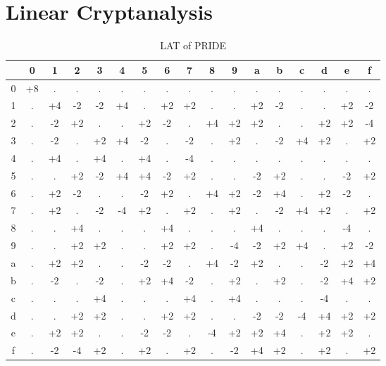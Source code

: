 \documentclass{transcrypto}
\begin{document}
	\section{Linear Cryptanalysis}
	\begin{table}[H]
		\centering
		\begin{tabular}{c|cccccccccccccccc}
			&0 &  1 &  2 &  3 &  4 &  5 &  6 &  7 &  8 &  9 &  a &  b &  c &  d &  e &  f\\
			\hline 
			0 &   +8 &    . &    . &    . &    . &    . &    . &    . &    . &    . &    . &    . &    . &    . &    . &    .\\
			1 &    . &   +4 &   -2 &   -2 &   +4 &    . &   +2 &   +2 &    . &    . &   +2 &   -2 &    . &    . &   +2 &   -2\\
			2 &    . &   -2 &   +2 &    . &    . &   +2 &   -2 &    . &   +4 &   +2 &   +2 &    . &    . &   +2 &   +2 &   -4\\
			3 &    . &   -2 &    . &   +2 &   +4 &   -2 &    . &   -2 &    . &   +2 &    . &   -2 &   +4 &   +2 &    . &   +2\\
			4 &    . &   +4 &    . &   +4 &    . &   +4 &    . &   -4 &    . &    . &    . &    . &    . &    . &    . &    .\\
			5 &    . &    . &   +2 &   -2 &   +4 &   +4 &   -2 &   +2 &    . &    . &   -2 &   +2 &    . &    . &   -2 &   +2\\
			6 &    . &   +2 &   -2 &    . &    . &   -2 &   +2 &    . &   +4 &   +2 &   -2 &   +4 &    . &   +2 &   -2 &    .\\
			7 &    . &   +2 &    . &   -2 &   -4 &   +2 &    . &   +2 &    . &   +2 &    . &   -2 &   +4 &   +2 &    . &   +2\\
			8 &    . &    . &   +4 &    . &    . &    . &   +4 &    . &    . &    . &   +4 &    . &    . &    . &   -4 &    .\\
			9 &    . &    . &   +2 &   +2 &    . &    . &   +2 &   +2 &    . &   -4 &   -2 &   +2 &   +4 &    . &   +2 &   -2\\
			a &    . &   +2 &   +2 &    . &    . &   -2 &   -2 &    . &   +4 &   -2 &   +2 &    . &    . &   -2 &   +2 &   +4\\
			b &    . &   -2 &    . &   -2 &    . &   +2 &   +4 &   -2 &    . &   +2 &    . &   +2 &    . &   -2 &   +4 &   +2\\
			c &    . &    . &    . &   +4 &    . &    . &    . &   +4 &    . &   +4 &    . &    . &    . &   -4 &    . &    .\\
			d &    . &    . &   +2 &   +2 &    . &    . &   +2 &   +2 &    . &    . &   -2 &   -2 &   -4 &   +4 &   +2 &   +2\\
			e &    . &   +2 &   +2 &    . &    . &   -2 &   -2 &    . &   -4 &   +2 &   +2 &   +4 &    . &   +2 &   +2 &    .\\
			f &    . &   -2 &   -4 &   +2 &    . &   +2 &    . &   +2 &    . &   -2 &   +4 &   +2 &    . &   +2 &    . &   +2\\
		\end{tabular}
		\caption{LAT of PRIDE}
	\end{table}
\end{document}
